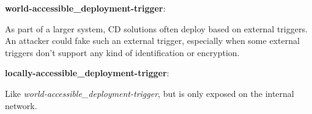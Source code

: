 \pagebreak[2]
\textbf{world-accessible\_deployment-trigger}: \begin{displayquote}
As part of a larger system, \acrshort{CD} solutions often deploy based on external triggers. An attacker could fake such an external trigger, especially when some external triggers don't support any kind of identification or encryption.\cite{docker-no-id}
\end{displayquote}

\pagebreak[2]
\textbf{locally-accessible\_deployment-trigger}: \begin{displayquote}
Like \textit{world-accessible\_deployment-trigger}, but is only exposed on the internal network. 
\end{displayquote}